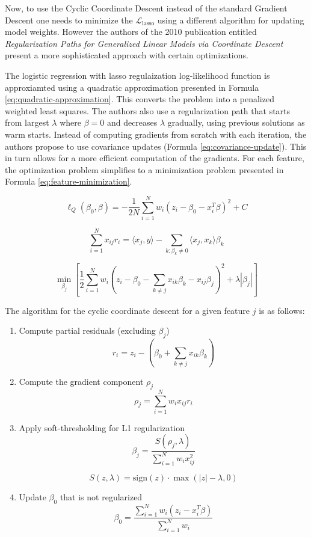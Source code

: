 \documentclass[12pt]{article}
\begin{document}
Now, to use the Cyclic Coordinate Descent instead of the standard Gradient Descent one needs to minimize the $\mathcal{L}_{\text{lasso}}$ using a different algorithm for updating model weights. However the authors of the 2010 publication entitled \textit{Regularization Paths for Generalized Linear Models via Coordinate Descent} \cite{Friedman2010} present a more sophisticated approach with certain optimizations.


The logistic regression with lasso regulaization log-likelihood function is approxiamted using a quadratic approximation presented in Formula \ref{eq:quadratic-approximation}. This converts the problem into a penalized weighted least squares. The authors also use a regularization path that starts from largest $\lambda$ where $\beta = 0$ and decreases $\lambda$ gradually, using previous solutions as warm starts. Instead of computing gradients from scratch with each iteration, the authors propose to use covariance updates (Formula \ref{eq:covariance-update}). This in turn allows for a more efficient computation of the gradients. For each feature, the optimization problem simplifies to a minimization problem presented in Formula \ref{eq:feature-minimization}.

\begin{equation}\label{eq:quadratic-approximation}
\ell_Q(\beta_0, \beta) = -\frac{1}{2N} \sum_{i=1}^{N} w_i (z_i - \beta_0 - x_i^T \beta)^2 + C
\end{equation}


\begin{equation}\label{eq:covariance-update}
\sum_{i=1}^{N} x_{ij} r_i = \langle x_j, y \rangle - \sum_{k: \beta_k \neq 0} \langle x_j, x_k \rangle \beta_k
\end{equation}

\begin{equation}\label{eq:feature-minimization}
    \min_{\beta_j} \left[ \frac{1}{2} \sum_{i=1}^{N} w_i \left( z_i - \beta_0 - \sum_{k \neq j} x_{ik} \beta_k - x_{ij} \beta_j \right)^2 + \lambda |\beta_j| \right]
\end{equation}


The algorithm for the cyclic coordinate descent for a given feature $j$ is as follows:
\begin{enumerate}
    \item Compute partial residuals (excluding $\beta_j$)
    $$
    r_i = z_i - (\beta_0 + \sum_{k \neq j} x_{ik} \beta_k)
    $$
    \item Compute the gradient component $\rho_j$
    $$
    \rho_j = \sum_{i=1}^{N} w_i x_{ij} r_i
    $$
    \item Apply soft-thresholding for L1 regularization
    $$
    \beta_j = \frac{S(\rho_j, \lambda)}{\sum_{i=1}^{N} w_i x_{ij}^2}
    $$
 
    $$
    S(z, \lambda) = \text{sign}(z) \cdot \max(|z| - \lambda, 0)
    $$
    \item Update $\beta_0$ that is not regularized
    $$
\beta_0 = \frac{\sum_{i=1}^{N} w_i (z_i - x_i^T \beta)}{\sum_{i=1}^{N} w_i}
$$

\end{enumerate}
\end{document}
